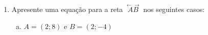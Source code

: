 \documentclass[a4paper,14pt]{article}
\begin{document}
\begin{multicols}{2}
\begin{enumerate}
\begin{enumerate}[a)]
    	        \item ~\\\\\\\\\\\\\\\\\\\\\\\\\\\\\\\\\\\\\\
    	        \item ~\\\\\\\\\\\\\\\\\\\\\\\\\\\\\\\\\\\\\\\\
    	        \item ~\\\\\\\\\\\\\\\\\\
    	    \end{enumerate}
            \item Apresente uma equação para a reta $\stackrel{\leftarrow\rightarrow}{AB}$ nos seguintes casos:
        	\begin{enumerate}[a)]
        		\item $A = (2; 8)$ e $B = (2; -4)$ \\\\\\\\\\\\\\\\\\\\

\end{enumerate}
\end{enumerate}
\end{multicols}
\end{document}
